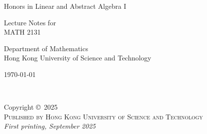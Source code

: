 \documentclass[
	11pt, %
	fleqn, %
	a4paper, %
]{LegrandOrangeBook}
\begin{document}

\titlepage %
	{ %
		\centering\sffamily %
		\vspace{3cm}
		{\huge\color{ocre} Honors in Linear and Abstract Algebra I\par} %
		\vspace{2cm} %
		{Lecture Notes for\\MATH 2131\par} %
        \vspace{2cm}
        {Department of Mathematics\\Hong Kong University of Science and Technology\par}
        \vspace{5cm}
        {\today \par}
		\vfill
	}


\thispagestyle{empty} %

~\vfill %

\noindent Copyright \copyright\ 2025 \\ %

\noindent \textsc{Published by Hong Kong University of Science and Technology}\\ %

\noindent \textit{First printing, September 2025} %

\end{document}
